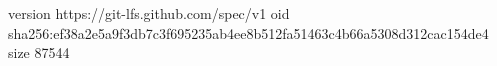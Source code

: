 version https://git-lfs.github.com/spec/v1
oid sha256:ef38a2e5a9f3db7c3f695235ab4ee8b512fa51463c4b66a5308d312cac154de4
size 87544
